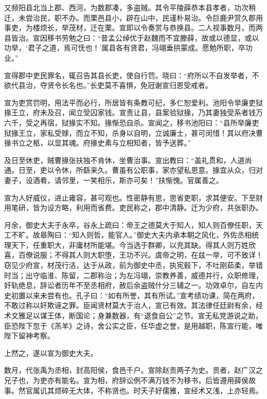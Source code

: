 \documentclass[12pt,UTF8]{ctexbook}
\begin{document}
又频阳县北当上郡、西河，为数郡凑，多盗贼。其令平陵薛恭本县孝者，功次稍迁，未尝治民，职不办。而栗邑县小，辟在山中，民谨朴易治。令巨鹿尹赏久郡用事吏，为楼烦长，举茂材，迁在栗。宣即以令奏赏与恭换县。二人视事数月，而两县皆治。宣因移书劳勉之曰：“昔孟公绰优于赵魏而不宜滕薛，故或以德显，或以功举，‘君子之道，焉可怃也！’属县各有贤君，冯翊垂拱蒙成。愿勉所职，卒功业。”



宣得郡中吏民罪名，辄召告其县长吏，使自行罚。晓曰：“府所以不自发举者，不欲代县治，夺贤令长名也。”长吏莫不喜惧，免冠谢宣归恩受戒者。



宣为吏赏罚明，用法平而必行，所居皆有条教可纪，多仁恕爱利。池阳令举廉吏狱掾王立，府未及召，闻立受囚家钱。宣责让县，县案验狱掾，乃其妻独受系者钱万六千，受之再宿，狱掾实不知。掾惭恐自杀。宣闻之，移书池阳曰：“县所举廉吏狱掾王立，家私受赇，而立不知，杀身以自明，立诚廉士，甚可闵惜！其以府决曹掾书立之柩，以显其魂。府掾史素与立相知者，皆予送葬。”



及日至休吏，贼曹掾张扶独不肯休，坐曹治事。宣出教曰：“盖礼贯和，人道尚通。日至，吏以令休，所繇来久。曹虽有公职事，家亦望私恩意。掾宜从众，归对妻子，设酒肴，请邻里，一笑相乐，斯亦可矣！”扶惭愧。官属善之。



宣为人好威仪，进止雍容，甚可观也。性密静有思，思省吏职，求其便安。下至财用笔研，皆为设方略，利用而省费。吏民称之，郡中清静。迁为少府，共张职办。



月余，御史大夫于永卒，谷永上疏曰：帝王之德莫大于知人，知人则百僚任职，天工不旷。故皋陶曰：“知人则哲，能官人。”御史大夫内承本朝之风化，外佐丞相统理天下，任重职大，非庸材所能堪。今当选于群卿，以充其缺。得其人则万姓欣喜，百僚说服；不得其人则大职堕，王功不兴。虞帝之明，在兹一举，可不致详！窃见少府宣，材茂行洁，达于从政，前为御史中丞，执宪毂下，不吐刚茹柔，举错时当；出守临淮、陈留，二郡称治；为左冯翊，崇教养善，威德并行，众职修理，奸轨绝息，辞讼者历年不至丞相府，赦后余盗贼什分三辅之一。功效卓尔，自左内史初置以来未尝有也。孔子曰：“如有所誉，其有所试。”宣考绩功课，简在两府，不敢过称以奸欺诬之罪。臣闻贤材莫大于治人，宣已有效。其法律任廷尉有余，经术文雅足以谋王体，断国论；身兼数器，有“退食自公”之节。宣无私党游说之助，臣恐陛下忽于《羔羊》之诗，舍公实之臣，任华虚之誉，是用越职，陈宣行能，唯陛下留神考察。



上然之，遂以宣为御史大夫。



数月，代张禹为丞相，封高阳侯，食邑千户。宣除赵贡两子为史。贡者，赵广汉之兄子也，为吏亦有能名。宣为相，府辞讼例不满万钱不为移书，后皆遵用薛侯故事。然官属讥其烦碎无大体，不称贤也。时天子好儒雅，宣经术又浅，上亦轻焉。
\end{document}
